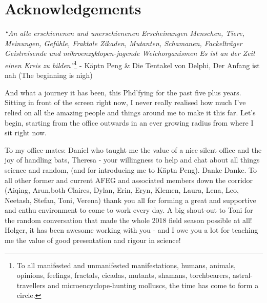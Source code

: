 \documentclass[
]{book}
\begin{document}
\hypertarget{acknowledgements-6}{%
\chapter{Acknowledgements}\label{acknowledgements-6}}

\emph{``An alle erschienenen und unerschienenen Erscheinungen
\newline
Menschen, Tiere, Meinungen, Gefühle, Fraktale
\newline
Zikaden, Mutanten, Schamanen, Fackelträger
\newline
Geistreisende und mikroenzyklopen-jagende Weichorganismen
\newline
Es ist an der Zeit einen Kreis zu bilden''}\footnote{To all manifested and unmanifested manifestations, humans, animals, opinions, feelings, fractals, cicadas, mutants, shamans, torchbearers, astral-travellers and microencyclope-hunting molluscs, the time has come to form a circle.}
\newline
- Käptn Peng \& Die Tentakel von Delphi, Der Anfang ist nah (The beginning is nigh)

And what a journey it has been, this Phd'fying for the past five plus years. Sitting in front of the screen right now, I never really realised how much I've relied on all the amazing people and things around me to make it this far. Let's begin, starting from the office outwards in an ever growing radius from where I sit right now.

To my office-mates: Daniel who taught me the value of a nice silent office and the joy of handling bats, Theresa - your willingness to help and chat about all things science and random, (and for introducing me to Käptn Peng). Danke Danke. To all other former and current AFEG and associated members down the corridor (Aiqing, Arun,both Claires, Dylan, Erin, Eryn, Klemen, Laura, Lena, Leo, Neetash, Stefan, Toni, Verena) thank you all for forming a great and supportive and enthu environment to come to work every day. A big shout-out to Toni for the random conversation that made the whole 2018 field season possible at all! Holger, it has been awesome working with you - and I owe you a lot for teaching me the value of good presentation and rigour in science!
\end{document}
